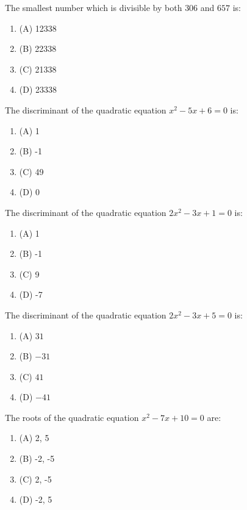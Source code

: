 \documentclass[12pt,a4paper]{exam}
\begin{document}
\begin{questions}
\question[1] The smallest number which is divisible by both $306$ and $657$ is:
\begin{enumerate}[label=(\Alph*)]
  \item (A) 12338
  \item (B) 22338
  \item (C) 21338
  \item (D) 23338
\end{enumerate}
\vspace{0.15cm}

\question[1] The discriminant of the quadratic equation $x^2 - 5x + 6 = 0$ is:
\begin{enumerate}[label=(\Alph*)]
  \item (A) 1
  \item (B) -1
  \item (C) 49
  \item (D) 0
\end{enumerate}
\vspace{0.15cm}

\question[1] The discriminant of the quadratic equation $2x^2 - 3x + 1 = 0$ is:
\begin{enumerate}[label=(\Alph*)]
  \item (A) 1
  \item (B) -1
  \item (C) 9
  \item (D) -7
\end{enumerate}
\vspace{0.15cm}

\question[1] The discriminant of the quadratic equation $2x^2 - 3x + 5 = 0$ is:
\begin{enumerate}[label=(\Alph*)]
  \item (A) $31$
  \item (B) $-31$
  \item (C) $41$
  \item (D) $-41$
\end{enumerate}
\vspace{0.15cm}

\question[1] The roots of the quadratic equation $x^2 - 7x + 10 = 0$ are:
\begin{enumerate}[label=(\Alph*)]
  \item (A) 2, 5
  \item (B) -2, -5
  \item (C) 2, -5
  \item (D) -2, 5
\end{enumerate}
\vspace{0.15cm}


\end{questions}
\end{document}
